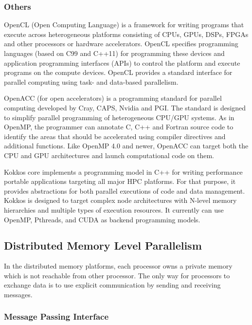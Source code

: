 \subsubsection{Others}

OpenCL (Open Computing Language) is a framework for writing programs that execute across heterogeneous platforms consisting of CPUs, GPUs, DSPs, FPGAs and other processors or hardware accelerators. OpenCL specifies programming languages (based on C99 and C++11) for programming these devices and application programming interfaces (APIs) to control the platform and execute programs on the compute devices. OpenCL provides a standard interface for parallel computing using task- and data-based parallelism.

OpenACC (for open accelerators) is a programming standard for parallel computing developed by Cray, CAPS, Nvidia and PGI. The standard is designed to simplify parallel programming of heterogeneous CPU/GPU systems. As in OpenMP, the programmer can annotate C, C++ and Fortran source code to identify the areas that should be accelerated using compiler directives and additional functions. Like OpenMP 4.0 and newer, OpenACC can target both the CPU and GPU architectures and launch computational code on them.

Kokkos \cite{edwards2014kokkos} core implements a programming model in C++ for writing performance portable applications targeting all major HPC platforms. For that purpose, it provides abstractions for both parallel executions of code and data management. Kokkos is designed to target complex node architectures with N-level memory hierarchies and multiple types of execution resources. It currently can use OpenMP, Pthreads, and CUDA as backend programming models.


\subsection{Distributed Memory Level Parallelism}

In the distributed memory platforms, each processor owns a private memory which is not reachable from other processor. The only way for processors to exchange data is to use explicit communication by sending and receiving messages. 

\subsubsection{Message Passing Interface}

